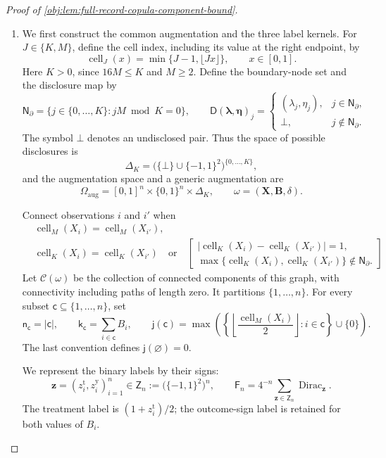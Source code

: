 \begin{proof}[Proof of \cref{obj:lem:full-record-copula-component-bound}]
\begin{enumerate}
\item
We first construct the common augmentation and the three label kernels. For \(J\in\{K,M\}\), define the cell index, including its value at the right endpoint, by
\[
\operatorname{cell}_J(x)=\min\{J-1,\lfloor Jx\rfloor\},
\qquad x\in[0,1].
\]
Here \(K>0\), since \(16M\le K\) and \(M\ge2\). Define the boundary-node set and the disclosure map by
\[
\mathsf N_{\partial}
 =\{j\in\{0,\ldots,K\}:jM\bmod K=0\},
\qquad
\mathsf D(\boldsymbol\lambda,\boldsymbol\eta)_j
 =
 \begin{cases}
 (\lambda_j,\eta_j),&j\in\mathsf N_{\partial},\\
 \bot,&j\notin\mathsf N_{\partial}.
 \end{cases}
\]
The symbol \(\bot\) denotes an undisclosed pair. Thus the space of possible disclosures is
\[
\mathsf\Delta_K
 =\bigl(\{\bot\}\cup\{-1,1\}^2\bigr)^{\{0,\ldots,K\}},
\]
and the augmentation space and a generic augmentation are
\[
\mathsf\Omega_{\mathrm{aug}}
 =[0,1]^n\times\{0,1\}^n\times\mathsf\Delta_K,
\qquad
\omega=(\mathbf X,\mathbf B,\delta).
\]

Connect observations \(i\) and \(i'\) when
\[
\begin{aligned}
&\operatorname{cell}_M(X_i)=\operatorname{cell}_M(X_{i'}),\\
&\operatorname{cell}_K(X_i)=\operatorname{cell}_K(X_{i'})
\quad\text{or}\quad
\left[
\begin{array}{c}
|\operatorname{cell}_K(X_i)-\operatorname{cell}_K(X_{i'})|=1,\\
\max\{\operatorname{cell}_K(X_i),\operatorname{cell}_K(X_{i'})\}
 \notin\mathsf N_{\partial}.
\end{array}
\right]
\end{aligned}
\]
Let \(\mathscr C(\omega)\) be the collection of connected components of this graph, with connectivity including paths of length zero. It partitions \(\{1,\ldots,n\}\). For every subset \(\mathsf c\subseteq\{1,\ldots,n\}\), set
\[
\mathsf n_{\mathsf c}=|\mathsf c|,
\qquad
\mathsf k_{\mathsf c}=\sum_{i\in\mathsf c}B_i,
\qquad
\mathsf j(\mathsf c)
 =\max\left(
 \left\{\left\lfloor\frac{\operatorname{cell}_M(X_i)}2\right\rfloor:
 i\in\mathsf c\right\}\cup\{0\}\right).
\]
The last convention defines \(\mathsf j(\varnothing)=0\).

We represent the binary labels by their signs:
\[
\mathbf z=(z_i^{\mathrm t},z_i^{\mathrm y})_{i=1}^n
 \in\mathsf Z_n:=\bigl(\{-1,1\}^2\bigr)^n,
\qquad
\mathsf F_n
 =4^{-n}\sum_{\mathbf z\in\mathsf Z_n}
       \operatorname{Dirac}_{\mathbf z}.
\]
The treatment label is \((1+z_i^{\mathrm t})/2\); the outcome-sign label is retained for both values of \(B_i\).


\end{enumerate}
\end{proof}
